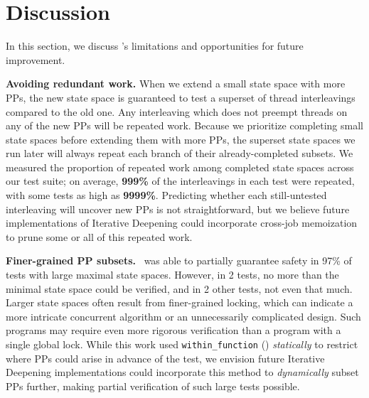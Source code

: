 
\section{Discussion}
\label{sec:future}

In this section, we discuss \quicksand's limitations and opportunities for future improvement.

{\bf Avoiding redundant work.}
When we extend a small state space with more PPs, the new state space is guaranteed to test a superset of thread interleavings compared to the old one.
Any interleaving which does not preempt threads on any of the new PPs will be repeated work.
Because we prioritize completing small state spaces before extending them with more PPs,
the superset state spaces we run later will always repeat each branch of their already-completed subsets.
%
We measured the proportion of repeated work among completed state spaces across our test suite;
on average, {\bf \large 999\%} of the interleavings in each test were repeated, with some tests as high as {\bf \large 9999\%}.
Predicting whether each still-untested interleaving will uncover new PPs is not straightforward,
but we believe future implementations of Iterative Deepening could incorporate cross-job memoization
to prune some or all of this repeated work.

{\bf Finer-grained PP subsets.}
\quicksand~was able to partially guarantee safety in 97\% of tests with large maximal state spaces.
However, in 2 tests, no more than the minimal state space could be verified,
and in 2 other tests, not even that much.
Larger state spaces often result from finer-grained locking,
which can indicate a more intricate concurrent algorithm or an unnecessarily complicated design.
Such programs may require even more rigorous verification than a program with a single global lock.
While this work used {\tt within\_function} (\sect{\ref{sec:landslide}}) {\em statically} to restrict where PPs could arise in advance of the test,
we envision future Iterative Deepening implementations could incorporate this method to {\em dynamically} subset PPs further,
making partial verification of such large tests possible.

